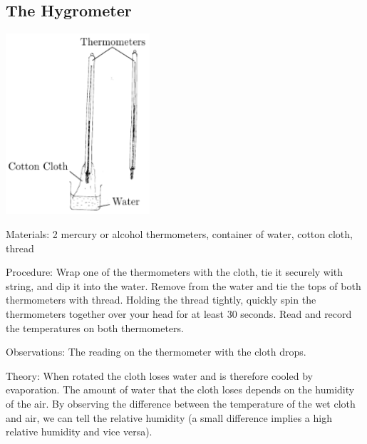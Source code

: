 \begin{multicols}{2}

\subsection{The Hygrometer}

\begin{center}
\includegraphics[width=0.4\textwidth]{./img/hygrometer.png}
\end{center}

\begin{description*}
\item[Materials:]{2 mercury or alcohol thermometers, container of water, cotton cloth, thread}
\item[Procedure:]{Wrap one of the thermometers with the cloth, tie it securely with string, and dip it into the water. Remove from the water and tie the tops of both thermometers with thread. Holding the thread tightly, quickly spin the thermometers together over your head for at least 30 seconds. Read and record the temperatures on both thermometers.}
\item[Observations:]{The reading on the thermometer with the cloth drops.}
\item[Theory:]{When rotated the cloth loses water and is therefore cooled by evaporation. The amount of water that the cloth loses depends on the humidity of the air. By observing the difference between the temperature of the wet cloth and air, we can tell the relative humidity (a small difference implies a high relative humidity and vice versa).}
\end{description*}



\end{multicols}

\pagebreak
